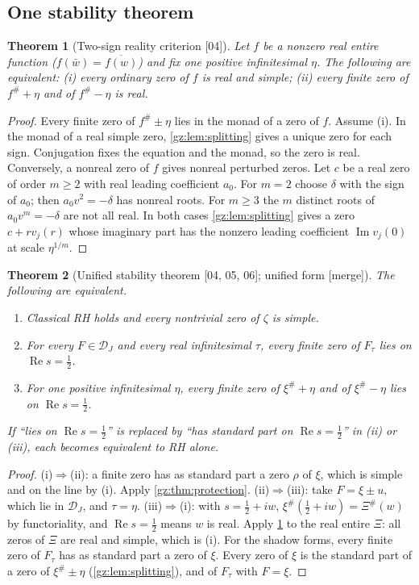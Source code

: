 \documentclass[11pt,a4paper]{article}
\numberwithin{equation}{section}
\newtheorem{theorem}{Theorem}[section]
\theoremstyle{definition}
\theoremstyle{remark}
\renewcommand{\Re}{\operatorname{Re}}
\renewcommand{\Im}{\operatorname{Im}}
\newcommand{\xip}{\xi^{\#}}
\newcommand{\DJs}{\mathcal D_{J}}
\newcommand{\src}[1]{\textup{[#1]}}
\newcommand{\merge}{\textup{[merge]}}
\begin{document}
\subsection{One stability theorem}
\begin{theorem}[Two-sign reality criterion \src{04}]\label{gz:thm:twosign}
Let $f$ be a nonzero real entire function ($f(\bar w)=\overline{f(w)}$) and
fix one positive infinitesimal $\eta$. The following are equivalent: (i)
every ordinary zero of $f$ is real and simple; (ii) every finite zero of
$f^\#+\eta$ and of $f^\#-\eta$ is real.
\end{theorem}
\begin{proof}
Every finite zero of $f^\#\pm\eta$ lies in the monad of a zero of $f$.
Assume (i). In the monad of a real simple zero, \cref{gz:lem:splitting}
gives a unique zero for each sign. Conjugation fixes the equation and the
monad, so the zero is real. Conversely, a nonreal zero of $f$ gives
nonreal perturbed zeros. Let $c$ be a real zero of order $m\ge2$ with real
leading coefficient $a_0$. For $m=2$ choose $\delta$ with the sign of
$a_0$; then $a_0v^2=-\delta$ has nonreal roots. For $m\ge3$ the $m$ distinct
roots of $a_0v^m=-\delta$ are not all real. In both cases
\cref{gz:lem:splitting} gives a zero $c+rv_j(r)$ whose imaginary part has
the nonzero leading coefficient $\Im v_j(0)$ at scale $\eta^{1/m}$.
\end{proof}

\begin{theorem}[Unified stability theorem \src{04, 05, 06}; unified form \merge]\label{gz:thm:stability}
The following are equivalent.
\begin{enumerate}[label=(\roman*)]
\item Classical RH holds and every nontrivial zero of $\zeta$ is simple.
\item For every $F\in\DJs$ and every real infinitesimal $\tau$, every finite
 zero of $F_\tau$ lies on $\Re s=\tfrac12$.
\item For one positive infinitesimal $\eta$, every finite zero of $\xip+\eta$
 and of $\xip-\eta$ lies on $\Re s=\tfrac12$.
\end{enumerate}
If ``lies on $\Re s=\tfrac12$'' is replaced by ``has standard part on
$\Re s=\tfrac12$'' in (ii) or (iii), each becomes equivalent to RH alone.
\end{theorem}
\begin{proof}
(i)$\Rightarrow$(ii): a finite zero has as standard part a zero $\rho$ of
$\xi$, which is simple and on the line by (i). Apply
\cref{gz:thm:protection}. (ii)$\Rightarrow$(iii): take $F=\xi\pm u$, which
lie in $\DJs$, and $\tau=\eta$. (iii)$\Rightarrow$(i): with $s=\tfrac12+iw$,
$\xip(\tfrac12+iw)=\Xi^\#(w)$ by functoriality, and $\Re s=\tfrac12$ means
$w$ is real. Apply \cref{gz:thm:twosign} to the real entire $\Xi$: all
zeros of $\Xi$ are real and simple, which is (i). For the shadow forms,
every finite zero of $F_\tau$ has as standard part a zero of $\xi$. Every
zero of $\xi$ is the standard part of a zero of $\xip\pm\eta$
(\cref{gz:lem:splitting}), and of $F_\tau$ with $F=\xi$.
\end{proof}
\end{document}
